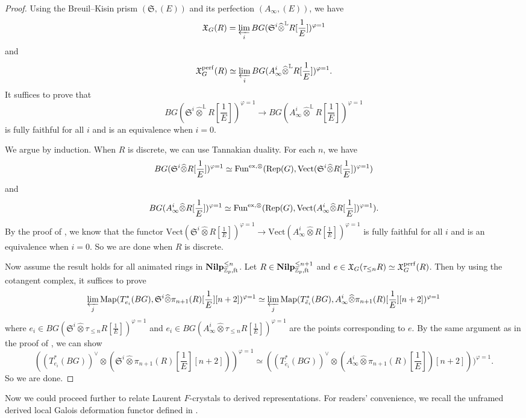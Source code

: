 \documentclass[10pt]{article}
\numberwithin{equation}{section}
\newcommand{\frakS}{{\mathfrak S}}
\newcommand{\frakX}{{\mathfrak X}}
\newcommand{\bL}{{\mathbb L}}
\newcommand{\bZ}{{\mathbb Z}}
\newcommand{\Map}{\mathrm{Map}}
\newcommand{\Rep}{{\mathrm{Rep}}}           %
\newcommand{\Vect}{{\mathrm{Vect}}}         %
\newcommand{\Fun}{\mathrm{Fun}}
\begin{document}
\begin{proof}
   Using the Breuil--Kisin prism $(\frakS,(E))$ and its perfection $(A_{\infty},(E))$, we have 
   \[
   \frakX_G(R)=\varprojlim_iBG(\frakS^i\widehat\otimes^{\bL}R[\frac{1}{E}])^{\varphi=1}
   \]
   and
   \[
   \frakX_G^{\rm perf}(R)\simeq\varprojlim_iBG(A_{\infty}^i\widehat\otimes^{\bL}R[\frac{1}{E}])^{\varphi=1}.
   \]
   It suffices to prove that
   \[
   BG(\frakS^i\widehat\otimes^{\bL}R[\frac{1}{E}])^{\varphi=1}\to BG(A_{\infty}^i\widehat\otimes^{\bL}R[\frac{1}{E}])^{\varphi=1}
   \]
   is fully faithful for all $i$ and is an equivalence when $i=0$.

   We argue by induction. When $R$ is discrete, we can use Tannakian duality. For each $n$, we have \[
   BG(\frakS^i\widehat\otimes R[\frac{1}{E}])^{\varphi=1}\simeq \Fun^{\rm ex,\otimes}(\Rep(G),\Vect(\frakS^i\widehat\otimes R[\frac{1}{E}])^{\varphi=1})\]
   and
   \[
   BG(A_{\infty}^i\widehat\otimes R[\frac{1}{E}])^{\varphi=1}\simeq \Fun^{\rm ex,\otimes}(\Rep(G),\Vect(A_{\infty}^i\widehat\otimes R[\frac{1}{E}])^{\varphi=1}).
   \]
By the proof of \cite[Proposition 2.23]{Min23}, we know that the functor $\Vect(\frakS^i\widehat\otimes R[\frac{1}{E}])^{\varphi=1}\to \Vect(A_{\infty}^i\widehat\otimes R[\frac{1}{E}])^{\varphi=1}$ is fully faithful for all $i$ and is an equivalence when $i=0$. So we are done when $R$ is discrete.

Now assume the result holds for all animated rings in $\textbf{Nilp}_{\bZ_p,\rm ft}^{\leq n}$. Let $R\in \textbf{Nilp}_{\bZ_p,\rm ft}^{\leq n+1}$ and $e\in \frakX_G(\tau_{\leq n}R)\simeq \frakX_G^{\rm perf}(R)$. Then by using the cotangent complex, it suffices to prove
\[
\varprojlim_j\Map(T^*_{e_i}(BG),\frakS^i\widehat\otimes\pi_{n+1}(R)[\frac{1}{E}][n+2])^{\varphi=1}\simeq \varprojlim_j\Map(T^*_{\tilde e_i}(BG),A_{\infty}^i\widehat\otimes\pi_{n+1}(R)[\frac{1}{E}][n+2])^{\varphi=1}
\]
where $e_i\in BG(\frakS^i\widehat\otimes\tau_{\leq n}R[\frac{1}{E}])^{\varphi=1}$ and $e_i\in BG(A_{\infty}^i\widehat\otimes\tau_{\leq n}R[\frac{1}{E}])^{\varphi=1}$ are the points corresponding to $e$. By the same argument as in the proof of \cite[Proposition 2.23]{Min23}, we can show \[((T^*_{e_i}(BG))^{\vee}\otimes(\frakS^i\widehat\otimes\pi_{n+1}(R)[\frac{1}{E}][n+2]))^{\varphi=1}\simeq ((T^*_{\tilde e_i}(BG))^\vee\otimes (A_{\infty}^i\widehat\otimes\pi_{n+1}(R)[\frac{1}{E}])[n+2]))^{\varphi=1}.\] So we are done.
\end{proof}

Now we could proceed further to relate Laurent $F$-crystals to derived representations. For readers' convenience, we recall the unframed derived local Galois deformation functor defined in \cite[Definition 5.4]{GV18}.
\end{document}
